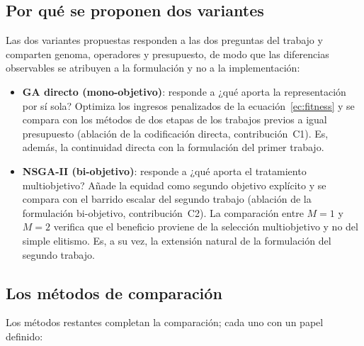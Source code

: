 \documentclass[11pt,a4paper]{article}
\begin{document}
\subsection{Por qué se proponen dos variantes}
\label{sec:dosvariantes}

Las dos variantes propuestas responden a las dos preguntas del trabajo y
comparten genoma, operadores y presupuesto, de modo que las diferencias
observables se atribuyen a la formulación y no a la implementación:

\begin{itemize}
\item \textbf{GA directo (mono-objetivo)}: responde a ¿qué aporta la
representación por sí sola? Optimiza los ingresos penalizados de la
ecuación~\eqref{ec:fitness} y se compara con los métodos de dos etapas de
los trabajos previos a igual presupuesto (ablación de la codificación
directa, contribución~C1). Es, además, la continuidad directa con la
formulación del primer trabajo.
\item \textbf{NSGA-II (bi-objetivo)}: responde a ¿qué aporta el tratamiento
multiobjetivo? Añade la equidad como segundo objetivo explícito y se
compara con el barrido escalar del segundo trabajo (ablación de la
formulación bi-objetivo, contribución~C2). La comparación entre $M{=}1$ y $M{=}2$ verifica que el
beneficio proviene de la selección multiobjetivo y no del simple elitismo.
Es, a su vez, la extensión natural de la formulación del segundo trabajo.
\end{itemize}

\subsection{Los métodos de comparación}
\label{sec:comparadores}

Los métodos restantes completan la comparación; cada uno con un papel
definido:
\end{document}
